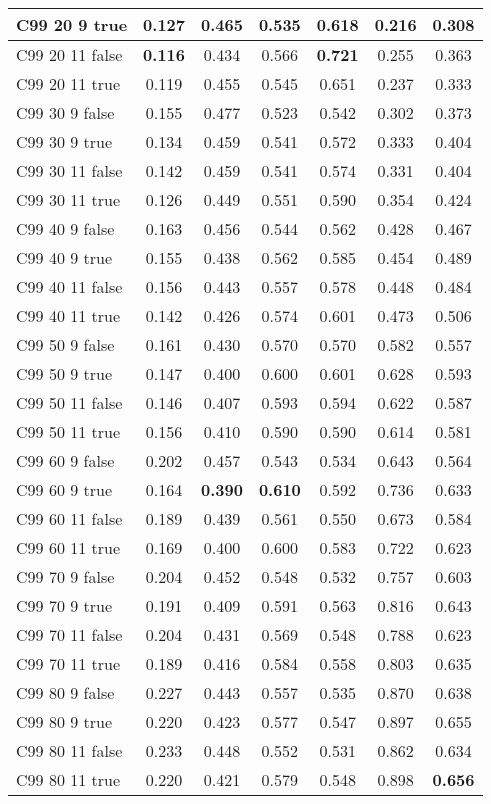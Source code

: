 \documentclass{article}
\begin{document}
\begin{tabular}{|l|c|c|c|c|c|c|}
C99 20  9 true & 0.127 & 0.465 & 0.535 & 0.618 & 0.216 & 0.308\\ \hline
C99 20 11 false & \textbf{0.116} & 0.434 & 0.566 & \textbf{0.721} & 0.255 & 0.363\\ \hline
C99 20 11 true & 0.119 & 0.455 & 0.545 & 0.651 & 0.237 & 0.333\\ \hline
C99 30  9 false & 0.155 & 0.477 & 0.523 & 0.542 & 0.302 & 0.373\\ \hline
C99 30  9 true & 0.134 & 0.459 & 0.541 & 0.572 & 0.333 & 0.404\\ \hline
C99 30 11 false & 0.142 & 0.459 & 0.541 & 0.574 & 0.331 & 0.404\\ \hline
C99 30 11 true & 0.126 & 0.449 & 0.551 & 0.590 & 0.354 & 0.424\\ \hline
C99 40  9 false & 0.163 & 0.456 & 0.544 & 0.562 & 0.428 & 0.467\\ \hline
C99 40  9 true & 0.155 & 0.438 & 0.562 & 0.585 & 0.454 & 0.489\\ \hline
C99 40 11 false & 0.156 & 0.443 & 0.557 & 0.578 & 0.448 & 0.484\\ \hline
C99 40 11 true & 0.142 & 0.426 & 0.574 & 0.601 & 0.473 & 0.506\\ \hline
C99 50  9 false & 0.161 & 0.430 & 0.570 & 0.570 & 0.582 & 0.557\\ \hline
C99 50  9 true & 0.147 & 0.400 & 0.600 & 0.601 & 0.628 & 0.593\\ \hline
C99 50 11 false & 0.146 & 0.407 & 0.593 & 0.594 & 0.622 & 0.587\\ \hline
C99 50 11 true & 0.156 & 0.410 & 0.590 & 0.590 & 0.614 & 0.581\\ \hline
C99 60  9 false & 0.202 & 0.457 & 0.543 & 0.534 & 0.643 & 0.564\\ \hline
C99 60  9 true & 0.164 & \textbf{0.390} & \textbf{0.610} & 0.592 & 0.736 & 0.633\\ \hline
C99 60 11 false & 0.189 & 0.439 & 0.561 & 0.550 & 0.673 & 0.584\\ \hline
C99 60 11 true & 0.169 & 0.400 & 0.600 & 0.583 & 0.722 & 0.623\\ \hline
C99 70  9 false & 0.204 & 0.452 & 0.548 & 0.532 & 0.757 & 0.603\\ \hline
C99 70  9 true & 0.191 & 0.409 & 0.591 & 0.563 & 0.816 & 0.643\\ \hline
C99 70 11 false & 0.204 & 0.431 & 0.569 & 0.548 & 0.788 & 0.623\\ \hline
C99 70 11 true & 0.189 & 0.416 & 0.584 & 0.558 & 0.803 & 0.635\\ \hline
C99 80  9 false & 0.227 & 0.443 & 0.557 & 0.535 & 0.870 & 0.638\\ \hline
C99 80  9 true & 0.220 & 0.423 & 0.577 & 0.547 & 0.897 & 0.655\\ \hline
C99 80 11 false & 0.233 & 0.448 & 0.552 & 0.531 & 0.862 & 0.634\\ \hline
C99 80 11 true & 0.220 & 0.421 & 0.579 & 0.548 & 0.898 & \textbf{0.656}\\ \hline
\end{tabular} 
\end{document}
